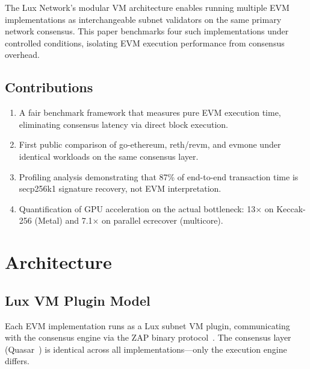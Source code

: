 \documentclass[11pt,twocolumn]{article}
\begin{document}
The Lux Network's modular VM architecture enables running multiple EVM implementations
as interchangeable subnet validators on the same primary network consensus. This paper
benchmarks four such implementations under controlled conditions, isolating EVM execution
performance from consensus overhead.

\subsection{Contributions}

\begin{enumerate}
\item A fair benchmark framework that measures pure EVM execution time, eliminating
      consensus latency via direct block execution.
\item First public comparison of go-ethereum, reth/revm, and evmone under identical
      workloads on the same consensus layer.
\item Profiling analysis demonstrating that 87\% of end-to-end transaction time is
      secp256k1 signature recovery, not EVM interpretation.
\item Quantification of GPU acceleration on the actual bottleneck: 13$\times$ on
      Keccak-256 (Metal) and 7.1$\times$ on parallel ecrecover (multicore).
\end{enumerate}

\section{Architecture}

\subsection{Lux VM Plugin Model}

Each EVM implementation runs as a Lux subnet VM plugin, communicating with the consensus
engine via the ZAP binary protocol~\cite{zap}. The consensus layer (Quasar~\cite{quasar})
is identical across all implementations---only the execution engine differs.
\end{document}
